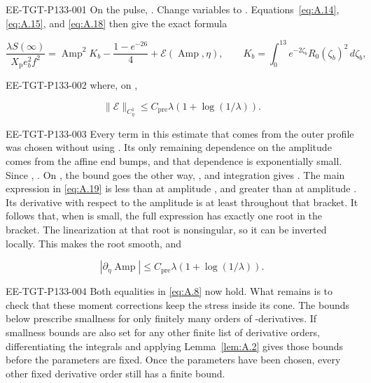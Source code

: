 %
\begin{EESegment}{EE-TGT-P133-001}
On the pulse, . Change variables to
. Equations~\eqref{eq:A.14}, \eqref{eq:A.15}, and
\eqref{eq:A.18} then give the exact formula
\end{EESegment}
\begin{equation}
 \frac{\lambda S(\infty)}{X_{\mathrm p} e_b^2 f^2}
 =\operatorname{Amp}^2K_b-\frac{1-e^{-26}}{4}+\mathcal E(\operatorname{Amp},\eta),
 \qquad
 K_b=\int_0^{13}e^{-2\zeta_b}R_0(\zeta_b)^2\,d\zeta_b,
 \tag{A.19}\label{eq:A.19}
\end{equation}
\begin{EESegment}{EE-TGT-P133-002}
where, on ,
\end{EESegment}
\[
 \lVert\mathcal E\rVert_{C^1_\eta}
 \leq C_{\mathrm{pre}}\lambda(1+\log(1/\lambda)).
\]
\begin{EESegment}{EE-TGT-P133-003}
Every term in this estimate that comes from the outer profile  was chosen without using
. Its only remaining dependence on the amplitude comes from the affine end
bumps, and that dependence is exponentially small. Since ,
. On
, the bound goes the other way,
, and integration gives
. The main expression in \eqref{eq:A.19} is less than
 at amplitude , and greater than
 at amplitude . Its derivative with respect to the
amplitude is at least  throughout that bracket. It follows that, when
 is small, the full expression has exactly one root in the bracket. The
linearization at that root is nonsingular, so it can be inverted locally. This makes the root smooth, and
\end{EESegment}
\begin{equation}
 |\partial_\eta\operatorname{Amp}|
 \leq C_{\mathrm{pre}}\lambda(1+\log(1/\lambda)).
 \tag{A.20}\label{eq:A.20}
\end{equation}
\begin{EESegment}{EE-TGT-P133-004}
Both equalities in \eqref{eq:A.8} now hold. What remains is to check that these moment corrections keep the stress
inside its cone. The bounds below prescribe smallness for only finitely many orders of
-derivatives. If smallness bounds are also set for any other finite list of derivative
orders, differentiating the integrals and applying Lemma~\ref{lem:A.2} gives those bounds before the parameters are
fixed. Once the parameters have been chosen, every other fixed derivative order still has a finite bound.
\end{EESegment}

